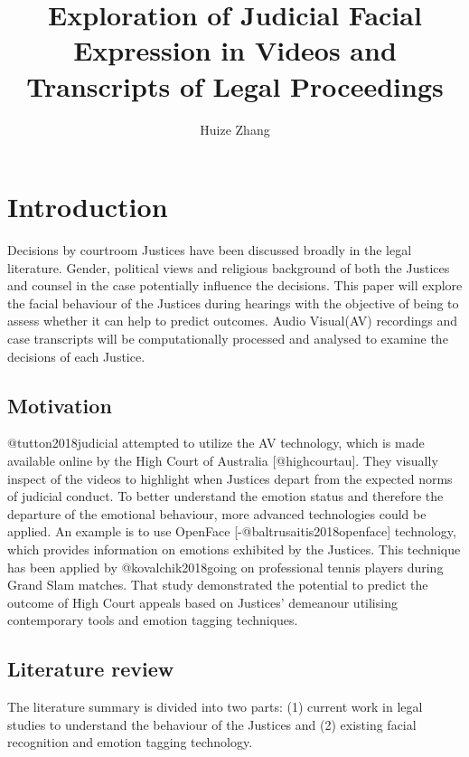 \documentclass{monashthesis}
\author{Huize Zhang}
\title{Exploration of Judicial Facial Expression in Videos and Transcripts of Legal Proceedings}
\begin{document}

\titlepage

{\sf\tighttoc\doublespacing}

\clearpage{}\setcounter{page}{0}

\hypertarget{ch:intro}{%
\chapter{Introduction}\label{ch:intro}}

Decisions by courtroom Justices have been discussed broadly in the legal literature. Gender, political views and religious background of both the Justices and counsel in the case potentially influence the decisions. This paper will explore the facial behaviour of the Justices during hearings with the objective of being to assess whether it can help to predict outcomes. Audio Visual(AV) recordings and case transcripts will be computationally processed and analysed to examine the decisions of each Justice.

\hypertarget{motivation}{%
\section{Motivation}\label{motivation}}

@tutton2018judicial attempted to utilize the AV technology, which is made available online by the High Court of Australia {[}@highcourtau{]}. They visually inspect of the videos to highlight when Justices depart from the expected norms of judicial conduct. To better understand the emotion status and therefore the departure of the emotional behaviour, more advanced technologies could be applied. An example is to use OpenFace {[}-@baltrusaitis2018openface{]} technology, which provides information on emotions exhibited by the Justices. This technique has been applied by @kovalchik2018going on professional tennis players during Grand Slam matches. That study demonstrated the potential to predict the outcome of High Court appeals based on Justices' demeanour utilising contemporary tools and emotion tagging techniques.

\hypertarget{literature-review}{%
\section{Literature review}\label{literature-review}}

The literature summary is divided into two parts: (1) current work in legal studies to understand the behaviour of the Justices and (2) existing facial recognition and emotion tagging technology.
\end{document}
